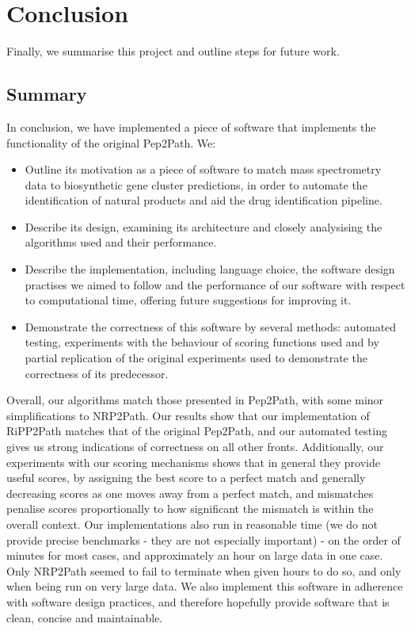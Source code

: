 \documentclass{l4proj}
\begin{document}
\chapter{Conclusion}    

Finally, we summarise this project and outline steps for future work.

\section{Summary}

In conclusion, we have implemented a piece of software that implements the functionality of the original Pep2Path. We:
\begin{itemize}
\item Outline its motivation as a piece of software to match mass spectrometry data to biosynthetic gene cluster predictions, in order to automate the identification of natural products and aid the drug identification pipeline.
\item Describe its design, examining its architecture and closely analysising the algorithms used and their performance.
\item Describe the implementation, including language choice, the software design practises we aimed to follow and the performance of our software with respect to computational time, offering future suggestions for improving it.
\item Demonstrate the correctness of this software by several methods: automated testing, experiments with the behaviour of scoring functions used and by partial replication of the original experiments used to demonstrate the correctness of its predecessor.
\end{itemize}

Overall, our algorithms match those presented in Pep2Path, with some minor simplifications to NRP2Path. Our results show that our implementation of RiPP2Path matches that of the original Pep2Path, and our automated testing gives us strong indications of correctness on all other fronts. Additionally, our experiments with our scoring mechanisms shows that in general they provide useful scores, by assigning the best score to a perfect match and generally decreasing scores as one moves away from a perfect match, and mismatches penalise scores proportionally to how significant the mismatch is within the overall context. Our implementations also run in reasonable time (we do not provide precise benchmarks - they are not especially important) - on the order of minutes for most cases, and approximately an hour on large data in one case. Only NRP2Path seemed to fail to terminate when given hours to do so, and only when being run on very large data. We also implement this software in adherence with software design practices, and therefore hopefully provide software that is clean, concise and maintainable.
\end{document}
